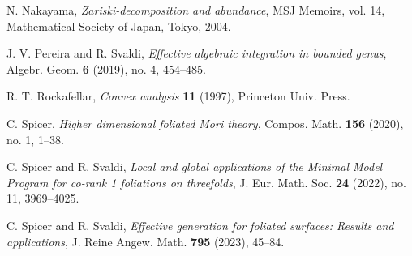 \documentclass[12pt]{amsart}
\numberwithin{equation}{section}
\theoremstyle{definition}
\theoremstyle{definition}
\theoremstyle{definition}
\begin{document}
\begin{thebibliography}{99}
 N. Nakayama, \textit{Zariski-decomposition and abundance}, MSJ Memoirs, vol. 14, Mathematical Society of Japan, Tokyo, 2004.


 J. V. Pereira and R. Svaldi, \textit{Effective algebraic integration in bounded genus}, Algebr. Geom. \textbf{6} (2019), no. 4, 454--485.


  R. T. Rockafellar, \textit{Convex analysis} \textbf{11} (1997), Princeton Univ. Press.



 C. Spicer, \textit{Higher dimensional foliated Mori theory}, Compos. Math. \textbf{156} (2020), no. 1, 1--38.

 C. Spicer and R. Svaldi, \textit{Local and global applications of the Minimal Model Program for co-rank 1 foliations on threefolds}, J. Eur. Math. Soc. \textbf{24} (2022), no. 11, 3969--4025.


 C. Spicer and R. Svaldi, \textit{Effective generation for foliated surfaces: Results and applications}, J. Reine Angew. Math. \textbf{795} (2023), 45--84.

\end{thebibliography}
\end{document}
